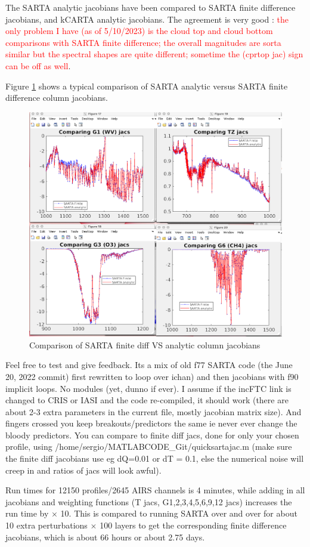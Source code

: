 \documentclass[11pt]{article}
\newcommand{\sa}{\textsf{SARTA}\xspace}
\begin{document}
The \sa analytic jacobians have been compared to \sa finite difference
jacobians, and kCARTA analytic jacobians. The agreement is very good :
\textcolor{red}{the only problem I have (as of 5/10/2023) is the cloud top and cloud
bottom comparisons with \sa finite difference; the overall magnitudes
are sorta similar but the spectral shapes are quite different; sometime the
(cprtop jac) sign can be off as well}.

Figure \ref{fig:fig3}
shows a typical comparison of \sa analytic versus \sa finite
difference column jacobians.

\begin{figure}[ht] \centering
   \includegraphics[width=.75\textwidth]{compare_finite_diff.png}
\caption{Comparison of \sa finite diff VS analytic column jacobians}
\label{fig:fig3}
\end{figure}

Feel free to test and give feedback. Its a mix of old f77 \sa code
(the June 20, 2022 commit) first rewritten to loop over ichan) and
then jacobians with f90 implicit loops. No modules (yet, dunno if
ever). I assume if the incFTC link is changed to CRIS or IASI and the
code re-compiled, it should work (there are about 2-3 extra parameters
in the current file, mostly jacobian matrix size). And fingers crossed
you keep breakouts/predictors the same ie never ever change the bloody
predictors.  You can compare to finite diff jacs, done for only your
chosen profile, using /home/sergio/MATLABCODE\_Git/quicksartajac.m
(make sure the finite diff jacobians use eg dQ=0.01 or dT = 0.1, else
the numerical noise will creep in and ratios of jacs will look awful).

Run times for 12150 profiles/2645 AIRS channels is 4 minutes, while
adding in all jacobians and weighting functions (T jacs,
G1,2,3,4,5,6,9,12 jacs) increases the run time by $\times$ 10. This is
compared to running \sa over and over for about 10 extra
perturbations $\times$ 100 layers to get the corresponding finite
difference jacobians, which is about 66 hours or about 2.75 days.
\end{document}
